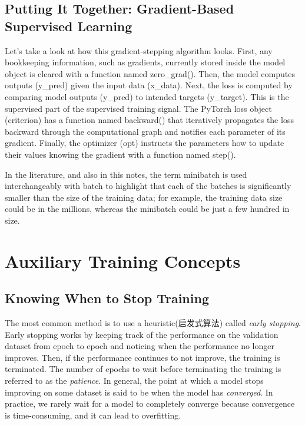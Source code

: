 \subsection{Putting It Together: Gradient-Based Supervised Learning}
Let's take a look at how this gradient-stepping algorithm looks. First, any bookkeeping information, such as gradients, currently stored inside the model object is cleared with a function named zero\_grad(). Then, the model computes outputs (y\_pred) given the input data (x\_data). Next, the loss is computed by comparing model outputs (y\_pred) to intended targets (y\_target). This is the supervised part of the supervised training signal. The PyTorch loss object (criterion) has a function named backward() that iteratively propagates the loss backward through the computational graph and notifies each parameter of its gradient. Finally, the optimizer (opt) instructs the parameters how to update their values knowing the gradient with a
function named step().

\begin{tcolorbox}
    In the literature, and also in this notes, the term minibatch is used interchangeably with batch to highlight that each of the batches is significantly smaller than the size of the training data; for example, the training data size could be in the millions, whereas the minibatch could be just a few hundred in size.
\end{tcolorbox}

\section{Auxiliary Training Concepts}
\subsection{Knowing When to Stop Training}
The most common method is to use a heuristic(启发式算法) called \textit{early stopping}.
Early stopping works by keeping track of the performance on the validation dataset
from epoch to epoch and noticing when the performance no longer improves. Then,
if the performance continues to not improve, the training is terminated. The number
of epochs to wait before terminating the training is referred to as the \textit{patience}.
In general, the point at which a model stops improving on some dataset is said to be when
the model has \textit{converged}. In practice, we rarely wait for a model to completely converge because convergence is time-consuming, and it can lead to overfitting.


